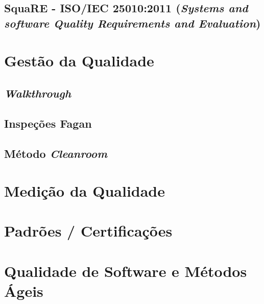 \documentclass[
	12pt,				%
	openright,			%
	twoside,			%
	a4paper,			%
	english,			%
	brazil,				%
	]{abntex2}
\begin{document}
\subsection{SquaRE - ISO/IEC 25010:2011 (\emph{Systems and software Quality Requirements
and Evaluation})}


\section{Gestão da Qualidade}


\subsection{\emph{Walkthrough}}


\subsection{Inspeções Fagan}


\subsection{Método \emph{Cleanroom}}

\section{Medição da Qualidade}

\section{Padrões / Certificações}

\section{Qualidade de Software e Métodos Ágeis}

\end{document}
